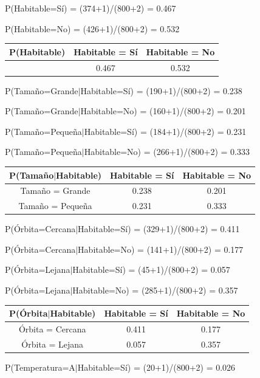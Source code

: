 \documentclass[11pt]{exam}
\begin{document}
\begin{questions}
P(Habitable=Sí) = (374+1)/(800+2) = 0.467

P(Habitable=No) = (426+1)/(800+2) = 0.532

\begin{center}
	\begin{tabular}{ |c|c|c| } 
		\hline
		P(Habitable) & Habitable = Sí & Habitable = No \\
		\hline
		& 0.467 & 0.532 \\ 
		\hline
	\end{tabular}
\end{center}

P(Tamaño=Grande$|$Habitable=Sí) = (190+1)/(800+2) = 0.238

P(Tamaño=Grande$|$Habitable=No) = (160+1)/(800+2) = 0.201

P(Tamaño=Pequeña$|$Habitable=Sí) = (184+1)/(800+2) = 0.231

P(Tamaño=Pequeña$|$Habitable=No) = (266+1)/(800+2) = 0.333

\begin{center}
	\begin{tabular}{ |c|c|c| } 
		\hline
		P(Tamaño$|$Habitable) & Habitable = Sí & Habitable = No \\
		\hline
		Tamaño = Grande & 0.238 & 0.201 \\ 
		\hline
		Tamaño = Pequeña & 0.231 & 0.333 \\ 
		\hline
	\end{tabular}
\end{center}

P(Órbita=Cercana$|$Habitable=Sí) = (329+1)/(800+2) = 0.411

P(Órbita=Cercana$|$Habitable=No) = (141+1)/(800+2) = 0.177

P(Órbita=Lejana$|$Habitable=Sí) = (45+1)/(800+2) = 0.057

P(Órbita=Lejana$|$Habitable=No) = (285+1)/(800+2) = 0.357

\begin{center}
	\begin{tabular}{ |c|c|c| } 
		\hline
		P(Órbita$|$Habitable) & Habitable = Sí & Habitable = No \\
		\hline
		Órbita = Cercana & 0.411 & 0.177 \\ 
		\hline
		Órbita = Lejana & 0.057 & 0.357 \\ 
		\hline
	\end{tabular}
\end{center}

P(Temperatura=A$|$Habitable=Sí) = (20+1)/(800+2) = 0.026


\end{questions}
\end{document}
